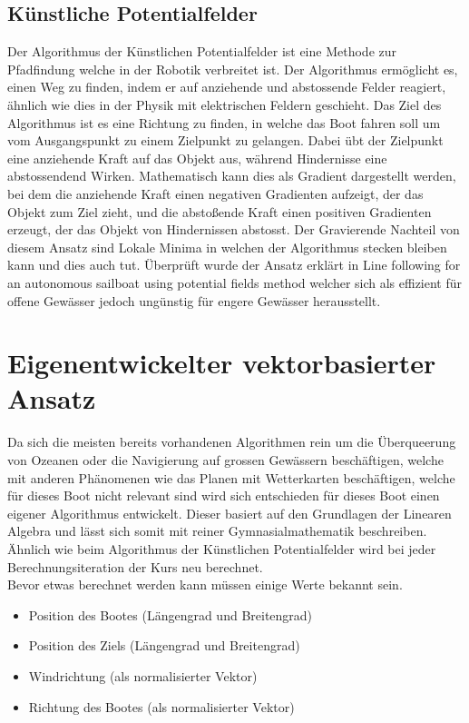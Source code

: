\subsection{Künstliche Potentialfelder} 
Der Algorithmus der Künstlichen Potentialfelder ist eine Methode zur Pfadfindung welche in der Robotik verbreitet ist. Der Algorithmus ermöglicht es, einen Weg zu finden, indem er auf anziehende und abstossende Felder reagiert, ähnlich wie dies in der Physik mit elektrischen Feldern geschieht.
Das Ziel des Algorithmus ist es eine Richtung zu finden, in welche das Boot fahren soll um vom Ausgangspunkt zu einem Zielpunkt zu gelangen. Dabei übt der Zielpunkt eine anziehende Kraft auf das Objekt aus, während Hindernisse eine abstossendend Wirken. Mathematisch kann dies als Gradient dargestellt werden, bei dem die anziehende Kraft einen negativen Gradienten aufzeigt, der das Objekt zum Ziel zieht, und die abstoßende Kraft einen positiven Gradienten erzeugt, der das Objekt von Hindernissen abstosst.
Der Gravierende Nachteil von diesem Ansatz sind Lokale Minima in welchen der Algorithmus stecken bleiben kann und dies auch tut. Überprüft wurde der Ansatz erklärt in Line following for an autonomous sailboat using potential ﬁelds method \cite{inproceedings} welcher sich als effizient für offene Gewässer jedoch ungünstig für engere Gewässer herausstellt. 

\section{Eigenentwickelter vektorbasierter Ansatz}
Da sich die meisten bereits vorhandenen Algorithmen rein um die Überqueerung von Ozeanen oder die Navigierung auf grossen Gewässern beschäftigen, welche mit anderen Phänomenen wie das Planen mit Wetterkarten beschäftigen, welche für dieses Boot nicht relevant sind wird sich entschieden für dieses Boot einen eigener Algorithmus entwickelt. Dieser basiert auf den Grundlagen der Linearen Algebra und lässt sich somit mit reiner Gymnasialmathematik beschreiben. Ähnlich wie beim Algorithmus der Künstlichen Potentialfelder wird bei jeder Berechnungsiteration der Kurs neu berechnet. \\
Bevor etwas berechnet werden kann müssen einige Werte bekannt sein. 
\begin{itemize}
    \item Position des Bootes (Längengrad und Breitengrad)
    \item Position des Ziels (Längengrad und Breitengrad)
    \item Windrichtung (als normalisierter Vektor)
    \item Richtung des Bootes (als normalisierter Vektor)
    
\end{itemize}

